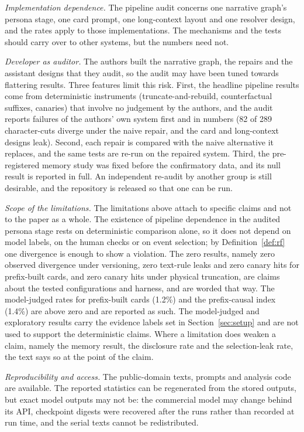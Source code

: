 \documentclass[sn-mathphys]{sn-jnl}%
\theoremstyle{thmstyleone}%
\theoremstyle{thmstyletwo}%
\theoremstyle{thmstylethree}%
\begin{document}
\emph{Implementation dependence.} The pipeline audit concerns one narrative graph's persona stage, one card prompt, one long-context layout and one resolver design, and the rates apply to those implementations. The mechanisms and the tests should carry over to other systems, but the numbers need not.

\emph{Developer as auditor.} The authors built the narrative graph, the repairs and the assistant designs that they audit, so the audit may have been tuned towards flattering results. Three features limit this risk. First, the headline pipeline results come from deterministic instruments (truncate-and-rebuild, counterfactual suffixes, canaries) that involve no judgement by the authors, and the audit reports failures of the authors' own system first and in numbers (82 of 289 character-cuts diverge under the naive repair, and the card and long-context designs leak). Second, each repair is compared with the naive alternative it replaces, and the same tests are re-run on the repaired system. Third, the pre-registered memory study was fixed before the confirmatory data, and its null result is reported in full. An independent re-audit by another group is still desirable, and the repository is released so that one can be run.

\emph{Scope of the limitations.} The limitations above attach to specific claims and not to the paper as a whole. The existence of pipeline dependence in the audited persona stage rests on deterministic comparison alone, so it does not depend on model labels, on the human checks or on event selection; by Definition~\ref{def:rf} one divergence is enough to show a violation. The zero results, namely zero observed divergence under versioning, zero text-rule leaks and zero canary hits for prefix-built cards, and zero canary hits under physical truncation, are claims about the tested configurations and harness, and are worded that way. The model-judged rates for prefix-built cards (1.2\%) and the prefix-causal index (1.4\%) are above zero and are reported as such. The model-judged and exploratory results carry the evidence labels set in Section~\ref{sec:setup} and are not used to support the deterministic claims. Where a limitation does weaken a claim, namely the memory result, the disclosure rate and the selection-leak rate, the text says so at the point of the claim.

\emph{Reproducibility and access.} The public-domain texts, prompts and analysis code are available. The reported statistics can be regenerated from the stored outputs, but exact model outputs may not be: the commercial model may change behind its API, checkpoint digests were recovered after the runs rather than recorded at run time, and the serial texts cannot be redistributed.
\end{document}

